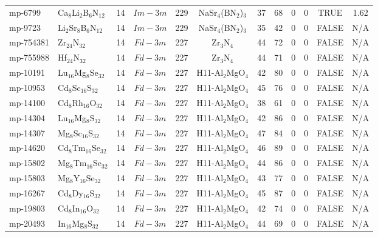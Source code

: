 {\begin{longtable}{llcccccccccc}
    mp-6799 & Ca$_{8}$Li$_{2}$B$_{6}$N$_{12}$ & 14    & $Im-3m$ & 229   & NaSr$_{4}$(BN$_{2}$)$_{3}$ & 37    & 68    & 0     & 0     & TRUE  & 1.62  \\
    mp-9723 & Li$_{2}$Sr$_{8}$B$_{6}$N$_{12}$ & 14    & $Im-3m$ & 229   & NaSr$_{4}$(BN$_{2}$)$_{3}$ & 35    & 42    & 0     & 0     & FALSE & N/A \\
    mp-754381 & Zr$_{24}$N$_{32}$ & 14    & $Fd-3m$ & 227   & Zr$_{3}$N$_{4}$ & 44    & 72    & 0     & 0     & FALSE & N/A \\
    mp-755988 & Hf$_{24}$N$_{32}$ & 14    & $Fd-3m$ & 227   & Zr$_{3}$N$_{4}$ & 44    & 71    & 0     & 0     & FALSE & N/A \\
    mp-10191 & Lu$_{16}$Mg$_{8}$Se$_{32}$ & 14    & $Fd-3m$ & 227   & H11-Al$_{2}$MgO$_{4}$ & 42    & 80    & 0     & 0     & FALSE & N/A \\
    mp-10953 & Cd$_{8}$Sc$_{16}$S$_{32}$ & 14    & $Fd-3m$ & 227   & H11-Al$_{2}$MgO$_{4}$ & 45    & 76    & 0     & 0     & FALSE & N/A \\
    mp-14100 & Cd$_{8}$Rh$_{16}$O$_{32}$ & 14    & $Fd-3m$ & 227   & H11-Al$_{2}$MgO$_{4}$ & 38    & 61    & 0     & 0     & FALSE & N/A \\
    mp-14304 & Lu$_{16}$Mg$_{8}$S$_{32}$ & 14    & $Fd-3m$ & 227   & H11-Al$_{2}$MgO$_{4}$ & 42    & 86    & 0     & 0     & FALSE & N/A \\
    mp-14307 & Mg$_{8}$Sc$_{16}$S$_{32}$ & 14    & $Fd-3m$ & 227   & H11-Al$_{2}$MgO$_{4}$ & 47    & 84    & 0     & 0     & FALSE & N/A \\
    mp-14620 & Cd$_{8}$Tm$_{16}$Se$_{32}$ & 14    & $Fd-3m$ & 227   & H11-Al$_{2}$MgO$_{4}$ & 46    & 89    & 0     & 0     & FALSE & N/A \\
    mp-15802 & Mg$_{8}$Tm$_{16}$Se$_{32}$ & 14    & $Fd-3m$ & 227   & H11-Al$_{2}$MgO$_{4}$ & 44    & 86    & 0     & 0     & FALSE & N/A \\
    mp-15803 & Mg$_{8}$Y$_{16}$Se$_{32}$ & 14    & $Fd-3m$ & 227   & H11-Al$_{2}$MgO$_{4}$ & 43    & 77    & 0     & 0     & FALSE & N/A \\
    mp-16267 & Cd$_{8}$Dy$_{16}$S$_{32}$ & 14    & $Fd-3m$ & 227   & H11-Al$_{2}$MgO$_{4}$ & 45    & 87    & 0     & 0     & FALSE & N/A \\
    mp-19803 & Cd$_{8}$In$_{16}$O$_{32}$ & 14    & $Fd-3m$ & 227   & H11-Al$_{2}$MgO$_{4}$ & 42    & 74    & 0     & 0     & FALSE & N/A \\
    mp-20493 & In$_{16}$Mg$_{8}$S$_{32}$ & 14    & $Fd-3m$ & 227   & H11-Al$_{2}$MgO$_{4}$ & 44    & 69    & 0     & 0     & FALSE & N/A \\

\end{longtable}}

